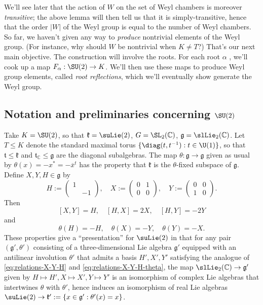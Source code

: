 \documentclass[reqno]{amsart} 
\begin{document}
We'll see later that the action of $W$ on the set of Weyl chambers is moreover \emph{transitive}; the above lemma will then tell us that it is simply-transitive, hence that the order $|W|$ of the Weyl group is equal to the number of Weyl chambers.  So far, we haven't given any way to \emph{produce} nontrivial elements of the Weyl group.  (For instance, why should $W$ be nontrivial when $K \neq T$?)  That's our next main objective.  The construction will involve the roots.  For each root $\alpha$ , we'll cook up a map $F_\alpha : \SU(2) \rightarrow K$.  We'll then use these maps to produce Weyl group elements, called \emph{root reflections}, which we'll eventually show generate the Weyl group.

\subsection{Notation and preliminaries concerning \texorpdfstring{$\SU(2)$}{SU(2)}}
Take $K = \SU(2)$, so that $\mathfrak{k} = \suLie(2)$, $G = \SL_2(\mathbb{C})$, $\mathfrak{g} = \slLie_2(\mathbb{C})$.  Let $T \leq K$ denote the standard maximal torus $\{\diag(t,t^{-1}) : t \in \U(1)\}$, so that $\mathfrak{t} \leq \mathfrak{k}$ and $\mathfrak{t}_{\mathbb{C}} \leq \mathfrak{g}$ are the diagonal subalgebras.  The map $\theta : \mathfrak{g} \rightarrow \mathfrak{g}$ given as usual by $\theta(x) = - x^* = - \overline{x}^t$ has the property that $\mathfrak{k}$ is the $\theta$-fixed subspace of $\mathfrak{g}$.  Define $X,Y,H \in \mathfrak{g}$ by
\begin{equation}\label{eq:defn-HXY}
  H := 
\begin{pmatrix}
    1 &  \\
    & -1
  \end{pmatrix}
, \quad X := 
\begin{pmatrix}
    0 & 1 \\
    0 & 0
  \end{pmatrix}
, \quad Y := 
\begin{pmatrix}
    0 & 0 \\
    1 & 0
  \end{pmatrix}
.
\end{equation}
Then
\begin{equation}\label{eq:relations-X-Y-H}
  [X,Y] = H,
  \quad
  [H, X] = 2 X,
  \quad
  [H, Y] = - 2 Y
\end{equation}
and
\begin{equation}\label{eq:relations-X-Y-H-theta}
  \theta(H) = - H,
  \quad
  \theta(X) = -Y,
  \quad
  \theta(Y) = -X.
\end{equation}
These properties give a ``presentation'' for $\suLie(2)$ in that for any pair $(\mathfrak{g} ', \theta')$ consisting of a three-dimensional Lie algebra $\mathfrak{g} '$ equipped with an antilinear involution $\theta'$ that admits a basis $H', X', Y'$ satisfying the analogue of \eqref{eq:relations-X-Y-H} and \eqref{eq:relations-X-Y-H-theta}, the map $\slLie_2(\mathbb{C}) \rightarrow \mathfrak{g} '$ given by $H \mapsto H', X \mapsto X', Y \mapsto Y'$ is an isomorphism of complex Lie algebras that intertwines $\theta$ with $\theta '$, hence induces an isomorphism of real Lie algebras $\suLie(2) \rightarrow \mathfrak{k} ' := \{x \in \mathfrak{g} ' : \theta '(x) = x\}$.
\end{document}
